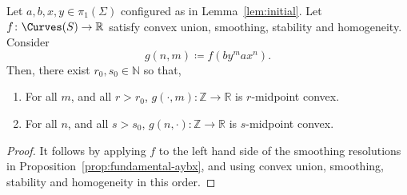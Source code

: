  \begin{lemma}
 Let $a, b, x, y \in \pi_1(\Sigma)$ configured as in Lemma~\ref{lem:initial}.
 Let $f \colon \Curves(S) \to \mathbb{R}$ satisfy convex union, smoothing, stability and homogeneity.
 Consider
 \[
 g(n,m) \coloneqq f(b y^m a x^n).
 \]
 Then, there exist $r_0,s_0 \in \mathbb{N}$ so that, 
 \begin{enumerate}
 \item For all $m$, and all $r>r_0$, $g(\cdot,m) \colon \mathbb{Z} \to \mathbb{R}$ is $r$-midpoint convex.
 \item For all $n$, and all $s>s_0$, $g(n,\cdot) \colon \mathbb{Z} \to \mathbb{R}$ is $s$-midpoint convex.
 \end{enumerate}
 \label{lem:axbymidconvex}
 \end{lemma}
\begin{proof}
It follows by applying $f$ to the left hand side of the smoothing resolutions in Proposition~\ref{prop:fundamental-aybx}, and using convex union, smoothing, stability and homogeneity in this order.
\end{proof}

